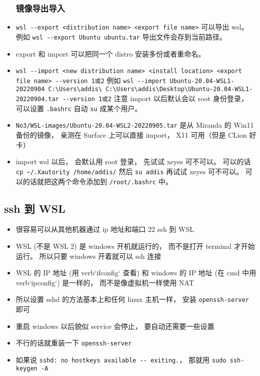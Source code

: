 \begin{itemize}
\subsubsection{镜像导出导入}
\item \verb`wsl --export <distribution name> <export file name>` 可以导出 wsl。 例如 \verb`wsl --export Ubuntu ubuntu.tar` 导出文件会存到当前路径。
\item export 和 import 可以把同一个 distro 安装多份或者重命名。
\item \verb`wsl --import <new distribution name> <install location> <export file name> --version 1或2` 例如 \verb`wsl --import Ubuntu-20.04-WSL1-20220904 C:\Users\addis\ C:\Users\addis\Desktop\Ubuntu-20.04-WSL1-20220904.tar --version 1或2` 注意 import 以后默认会以 root 身份登录， 可以设置 \verb`.bashrc` 自动 \verb`su` 成某个用户。
\item \verb`No3/WSL-images/Ubuntu-20.04-WSL2-20220905.tar` 是从 Miranda 的 Win11 备份的镜像， 亲测在 Surface 上可以直接 import， X11 可用（但是 CLion 好卡）
\item import wsl 以后， 会默认用 root 登录， 先试试 xeyes 可不可以。 可以的话 \verb`cp ~/.Xautority /home/addis/` 然后 \verb`su addis` 再试试 xeyes 可不可以。 可以的话就把这两个命令添加到 \verb`/root/.bashrc` 中。
\end{itemize}

\subsection{ssh 到 WSL}
\begin{itemize}
\item 很容易可以从其他机器通过 ip 地址和端口 22 ssh 到 WSL
\item WSL (不是 WSL 2) 是 windows 开机就运行的， 而不是打开 terminal 才开始运行。 所以只要 windows 开着就可以 ssh 连接
\item WSL 的 IP 地址 (用 verb`ifconfig` 查看) 和 windows 的 IP 地址 (在 cmd 中用 verb`ipconfig`) 是一样的， 而不是像虚拟机一样使用 NAT
\item 所以设置 sshd 的方法基本上和任何 linux 主机一样， 安装 \verb`openssh-server` 即可
\item 重启 windows 以后貌似 service 会停止， 要自动还需要一些设置
\item 不行的话就重装一下 \verb|openssh-server|
\item 如果说 \verb|sshd: no hostkeys available -- exiting.|， 那就用 \verb|sudo ssh-keygen -A|
\end{itemize}

